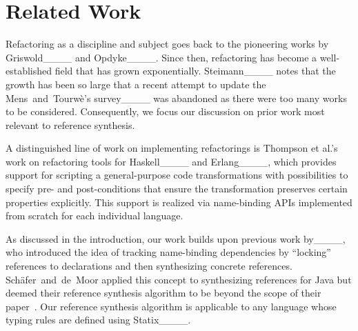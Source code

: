 \section{Related Work}
%
\label{sec:related-work}


Refactoring as a discipline and subject goes back to the pioneering works by Griswold____ and Opdyke____.
Since then, refactoring has become a well-established field that has grown exponentially.
Steimann____ notes that the growth has been so large that a recent attempt to update the Mens~and~Tourw\`{e}'s survey____ was abandoned as there were too many works to be considered.
Consequently, we focus our discussion on prior work most relevant to reference synthesis.

A distinguished line of work on implementing refactorings is Thompson et al.'s work on refactoring tools for Haskell____ and Erlang____, which provides support for scripting a general-purpose code transformations with possibilities to specify pre- and post-conditions that ensure the transformation preserves certain properties explicitly.
This support is realized via name-binding APIs implemented from scratch for each individual language.


As discussed in the introduction, our work builds upon previous work by____, who introduced the idea of tracking name-binding dependencies by ``locking'' references to declarations and then synthesizing concrete references.
Sch\"{a}fer~and~de~Moor applied this concept to synthesizing references for Java but deemed their reference synthesis algorithm to be beyond the scope of their paper~\cite[\S{2}]{SchaferMOOPSLA2010}.
Our reference synthesis algorithm is applicable to any language whose typing rules are defined using Statix____.


